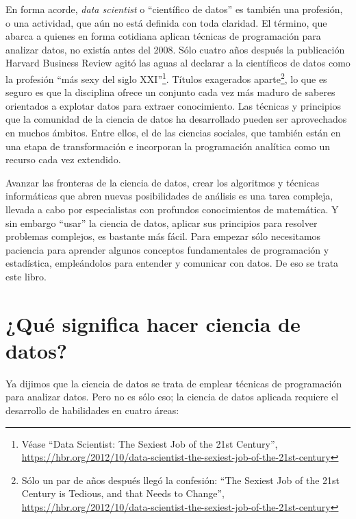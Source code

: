 \documentclass[
]{book}
\begin{document}
En forma acorde, \emph{data scientist} o ``científico de datos'' es también una profesión, o una actividad, que aún no está definida con toda claridad. El término, que abarca a quienes en forma cotidiana aplican técnicas de programación para analizar datos, no existía antes del 2008. Sólo cuatro años después la publicación Harvard Business Review agitó las aguas al declarar a la científicos de datos como la profesión ``más sexy del siglo XXI''\footnote{Véase ``Data Scientist: The Sexiest Job of the 21st Century'', \url{https://hbr.org/2012/10/data-scientist-the-sexiest-job-of-the-21st-century}}. Títulos exagerados aparte\footnote{Sólo un par de años después llegó la confesión: ``The Sexiest Job of the 21st Century is Tedious, and that Needs to Change'', \url{https://hbr.org/2012/10/data-scientist-the-sexiest-job-of-the-21st-century}}, lo que es seguro es que la disciplina ofrece un conjunto cada vez más maduro de saberes orientados a explotar datos para extraer conocimiento. Las técnicas y principios que la comunidad de la ciencia de datos ha desarrollado pueden ser aprovechados en muchos ámbitos. Entre ellos, el de las ciencias sociales, que también están en una etapa de transformación e incorporan la programación analítica como un recurso cada vez extendido.

Avanzar las fronteras de la ciencia de datos, crear los algoritmos y técnicas informáticas que abren nuevas posibilidades de análisis es una tarea compleja, llevada a cabo por especialistas con profundos conocimientos de matemática. Y sin embargo ``usar'' la ciencia de datos, aplicar sus principios para resolver problemas complejos, es bastante más fácil. Para empezar sólo necesitamos paciencia para aprender algunos conceptos fundamentales de programación y estadística, empleándolos para entender y comunicar con datos. De eso se trata este libro.

\hypertarget{quuxe9-significa-hacer-ciencia-de-datos}{%
\section{¿Qué significa hacer ciencia de datos?}\label{quuxe9-significa-hacer-ciencia-de-datos}}

Ya dijimos que la ciencia de datos se trata de emplear técnicas de programación para analizar datos. Pero no es sólo eso; la ciencia de datos aplicada requiere el desarrollo de habilidades en cuatro áreas:
\end{document}
